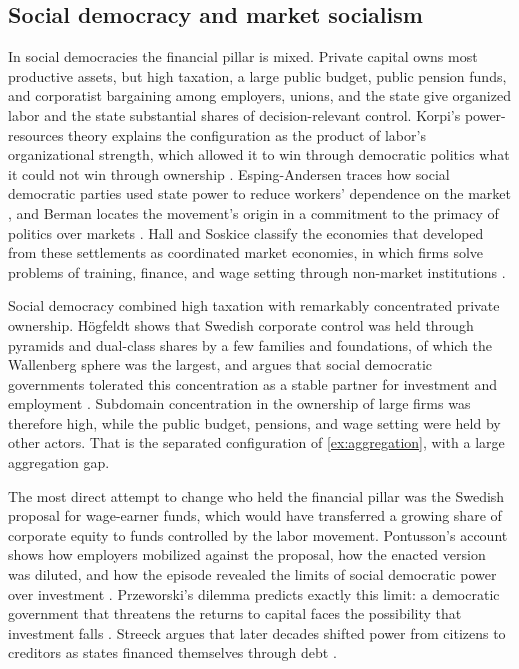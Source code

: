 \documentclass[11pt,letterpaper]{article}
\theoremstyle{definition}
\theoremstyle{remark}
\begin{document}
\subsection{Social democracy and market socialism}

In social democracies the financial pillar is mixed. Private capital owns most productive assets, but high taxation, a large public budget, public pension funds, and corporatist bargaining among employers, unions, and the state give organized labor and the state substantial shares of decision-relevant control. Korpi's power-resources theory explains the configuration as the product of labor's organizational strength, which allowed it to win through democratic politics what it could not win through ownership \citep{korpi1983}. Esping-Andersen traces how social democratic parties used state power to reduce workers' dependence on the market \citep{esping1985}, and Berman locates the movement's origin in a commitment to the primacy of politics over markets \citep{berman2006}. Hall and Soskice classify the economies that developed from these settlements as coordinated market economies, in which firms solve problems of training, finance, and wage setting through non-market institutions \citep{hallsoskice2001}.

Social democracy combined high taxation with remarkably concentrated private ownership. H\"ogfeldt shows that Swedish corporate control was held through pyramids and dual-class shares by a few families and foundations, of which the Wallenberg sphere was the largest, and argues that social democratic governments tolerated this concentration as a stable partner for investment and employment \citep{hogfeldt2005}. Subdomain concentration in the ownership of large firms was therefore high, while the public budget, pensions, and wage setting were held by other actors. That is the separated configuration of \cref{ex:aggregation}, with a large aggregation gap.

The most direct attempt to change who held the financial pillar was the Swedish proposal for wage-earner funds, which would have transferred a growing share of corporate equity to funds controlled by the labor movement. Pontusson's account shows how employers mobilized against the proposal, how the enacted version was diluted, and how the episode revealed the limits of social democratic power over investment \citep{pontusson1992}. Przeworski's dilemma predicts exactly this limit: a democratic government that threatens the returns to capital faces the possibility that investment falls \citep{przeworski1985}. Streeck argues that later decades shifted power from citizens to creditors as states financed themselves through debt \citep{streeck2014}.
\end{document}
